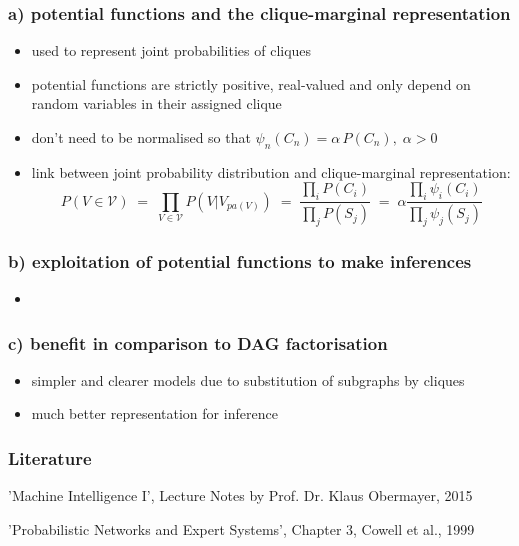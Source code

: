 \documentclass[10 pt]{beamer}
\begin{document}
\begin{frame}
  \frametitle{a) potential functions and the clique-marginal representation}

\begin{itemize}
\item used to represent joint probabilities of cliques
\item potential functions are strictly positive, real-valued and only depend on random variables in their assigned clique
\item don't need to be normalised so that $\psi_n(C_n) = \alpha\,P(C_n),\;\alpha>0$
\item link between joint probability distribution and clique-marginal representation:
\begin{equation}
P(V \in \mathcal{V})\;=\;\prod_{V \in \mathcal{V}} P(V|V_{pa(V)})\;=\;\frac{\prod_i P(C_i)}{\prod_j P(S_j)}\;=\; \alpha \frac{\prod_i \psi_i(C_i)}{\prod_j \psi_j(S_j)}
\end{equation}
\end{itemize}


\end{frame}
\begin{frame}
  \frametitle{b) exploitation of potential functions to make inferences}

\begin{itemize}
\item
\end{itemize}


\end{frame}
\begin{frame}
  \frametitle{c) benefit in comparison to DAG factorisation}

\begin{itemize}
\item simpler and clearer models due to substitution of subgraphs by cliques
\item much better representation for inference
\end{itemize}


\end{frame}

\begin{frame}
\frametitle{Literature}
\footnotesize{
\begin{thebibliography}{99}

'Machine Intelligence I', Lecture Notes by Prof. Dr. Klaus Obermayer, 2015

'Probabilistic Networks and Expert Systems', Chapter 3, Cowell et al., 1999

\end{thebibliography}}
\end{frame}

\end{document}
